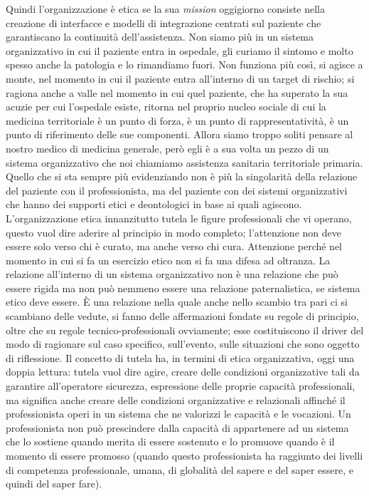 \documentclass[]{article}
\begin{document}
Quindi l'organizzazione è etica se la sua \emph{mission} oggigiorno
consiste nella creazione di interfacce e modelli di integrazione
centrati sul paziente che garantiscano la continuità dell'assistenza.
Non siamo più in un sistema organizzativo in cui il paziente entra in
ospedale, gli curiamo il sintomo e molto spesso anche la patologia e lo
rimandiamo fuori. Non funziona più così, si agisce a monte, nel momento
in cui il paziente entra all'interno di un target di rischio; si ragiona
anche a valle nel momento in cui quel paziente, che ha superato la sua
acuzie per cui l'ospedale esiste, ritorna nel proprio nucleo sociale di
cui la medicina territoriale è un punto di forza, è un punto di
rappresentatività, è un punto di riferimento delle sue componenti.
Allora siamo troppo soliti pensare al nostro medico di medicina
generale, però egli è a sua volta un pezzo di un sistema organizzativo
che noi chiamiamo assistenza sanitaria territoriale primaria. Quello che
si sta sempre più evidenziando non è più la singolarità della relazione
del paziente con il professionista, ma del paziente con dei sistemi
organizzativi che hanno dei supporti etici e deontologici in base ai
quali agiscono. L'organizzazione etica innanzitutto tutela le figure
professionali che vi operano, questo vuol dire aderire al principio in
modo completo; l'attenzione non deve essere solo verso chi è curato, ma
anche verso chi cura. Attenzione perché nel momento in cui si fa un
esercizio etico non si fa una difesa ad oltranza. La relazione
all'interno di un sistema organizzativo non è una relazione che può
essere rigida ma non può nemmeno essere una relazione paternalistica, se
sistema etico deve essere. È una relazione nella quale anche nello
scambio tra pari ci si scambiano delle vedute, si fanno delle
affermazioni fondate su regole di principio, oltre che su regole
tecnico-professionali ovviamente; esse costituiscono il driver del modo
di ragionare sul caso specifico, sull'evento, sulle situazioni che sono
oggetto di riflessione. Il concetto di tutela ha, in termini di etica
organizzativa, oggi una doppia lettura: tutela vuol dire agire, creare
delle condizioni organizzative tali da garantire all'operatore
sicurezza, espressione delle proprie capacità professionali, ma
significa anche creare delle condizioni organizzative e relazionali
affinché il professionista operi in un sistema che ne valorizzi le
capacità e le vocazioni. Un professionista non può prescindere dalla
capacità di appartenere ad un sistema che lo sostiene quando merita di
essere sostenuto e lo promuove quando è il momento di essere promosso
(quando questo professionista ha raggiunto dei livelli di competenza
professionale, umana, di globalità del sapere e del saper essere, e
quindi del saper fare).
\end{document}
